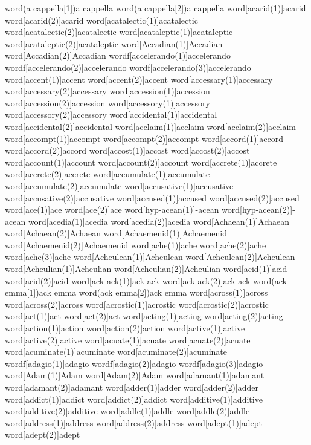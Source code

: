 word(a cappella[1]){a cappella}
word(a cappella[2]){a cappella}
word[acarid(1)]{acarid}
word[acarid(2)]{acarid}
word[acatalectic(1)]{acatalectic}
word[acatalectic(2)]{acatalectic}
word[acataleptic(1)]{acataleptic}
word[acataleptic(2)]{acataleptic}
word[Accadian(1)]{Accadian}
word[Accadian(2)]{Accadian}
wordf[accelerando(1)]{accelerando}
wordf[accelerando(2)]{accelerando}
wordf[accelerando(3)]{accelerando}
word[accent(1)]{accent}
word[accent(2)]{accent}
word[accessary(1)]{accessary}
word[accessary(2)]{accessary}
word[accession(1)]{accession}
word[accession(2)]{accession}
word[accessory(1)]{accessory}
word[accessory(2)]{accessory}
word[accidental(1)]{accidental}
word[accidental(2)]{accidental}
word[acclaim(1)]{acclaim}
word[acclaim(2)]{acclaim}
word[accompt(1)]{accompt}
word[accompt(2)]{accompt}
word[accord(1)]{accord}
word[accord(2)]{accord}
word[accost(1)]{accost}
word[accost(2)]{accost}
word[account(1)]{account}
word[account(2)]{account}
word[accrete(1)]{accrete}
word[accrete(2)]{accrete}
word[accumulate(1)]{accumulate}
word[accumulate(2)]{accumulate}
word[accusative(1)]{accusative}
word[accusative(2)]{accusative}
word[accused(1)]{accused}
word[accused(2)]{accused}
word[ace(1)]{ace}
word[ace(2)]{ace}
word[hyp-acean(1)]{-acean}
word[hyp-acean(2)]{-acean}
word[acedia(1)]{acedia}
word[acedia(2)]{acedia}
word[Achaean(1)]{Achaean}
word[Achaean(2)]{Achaean}
word[Achaemenid(1)]{Achaemenid}
word[Achaemenid(2)]{Achaemenid}
word[ache(1)]{ache}
word[ache(2)]{ache}
word[ache(3)]{ache}
word[Acheulean(1)]{Acheulean}
word[Acheulean(2)]{Acheulean}
word[Acheulian(1)]{Acheulian}
word[Acheulian(2)]{Acheulian}
word[acid(1)]{acid}
word[acid(2)]{acid}
word[ack-ack(1)]{ack-ack}
word[ack-ack(2)]{ack-ack}
word(ack emma[1]){ack emma}
word(ack emma[2]){ack emma}
word[across(1)]{across}
word[across(2)]{across}
word[acrostic(1)]{acrostic}
word[acrostic(2)]{acrostic}
word[act(1)]{act}
word[act(2)]{act}
word[acting(1)]{acting}
word[acting(2)]{acting}
word[action(1)]{action}
word[action(2)]{action}
word[active(1)]{active}
word[active(2)]{active}
word[acuate(1)]{acuate}
word[acuate(2)]{acuate}
word[acuminate(1)]{acuminate}
word[acuminate(2)]{acuminate}
wordf[adagio(1)]{adagio}
wordf[adagio(2)]{adagio}
wordf[adagio(3)]{adagio}
word[Adam(1)]{Adam}
word[Adam(2)]{Adam}
word[adamant(1)]{adamant}
word[adamant(2)]{adamant}
word[adder(1)]{adder}
word[adder(2)]{adder}
word[addict(1)]{addict}
word[addict(2)]{addict}
word[additive(1)]{additive}
word[additive(2)]{additive}
word[addle(1)]{addle}
word[addle(2)]{addle}
word[address(1)]{address} 
word[address(2)]{address} 
word[adept(1)]{adept}
word[adept(2)]{adept}
